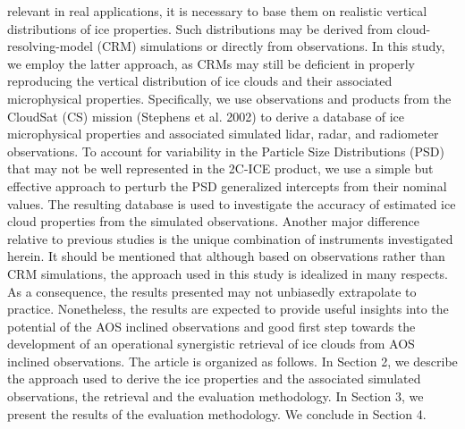 \documentclass{ametsocV6.1}
\begin{document}
relevant in real applications, it is necessary to base them on realistic vertical distributions of ice properties.  Such distributions may be derived from cloud-resolving-model (CRM) simulations \citep{pfreundschuh2020synergistic,liu2022assessing} or directly from observations.  In this study, we employ the latter approach, as CRMs may still be deficient in properly reproducing the vertical distribution of ice clouds and their associated microphysical properties.  Specifically, we use observations and products from the CloudSat (CS) mission (Stephens et al. 2002) to derive a database of ice microphysical properties and associated simulated lidar, radar, and radiometer observations.  To account for variability in the Particle Size Distributions (PSD) that may not be well represented in the 2C-ICE product, we use a simple but effective approach to perturb the PSD generalized intercepts from their nominal values.
The resulting database is used to investigate the accuracy of estimated ice cloud properties from the simulated observations. Another major difference relative to previous studies is the unique combination of instruments investigated herein. It should be mentioned that although based on observations rather than CRM simulations, the approach used in this study is
idealized in many respects. As a consequence, the results presented may not unbiasedly extrapolate to practice.
Nonetheless, the results are expected to provide useful insights into the potential of the AOS inclined observations and
good first step towards the development of an operational synergistic retrieval of ice clouds from AOS inclined observations. The article is organized as follows.  In Section 2, we describe the approach used to derive the ice properties and the associated simulated observations, the retrieval and the evaluation methodology.  In Section 3, we present the results of the evaluation methodology. We conclude in Section 4.

\end{document}
